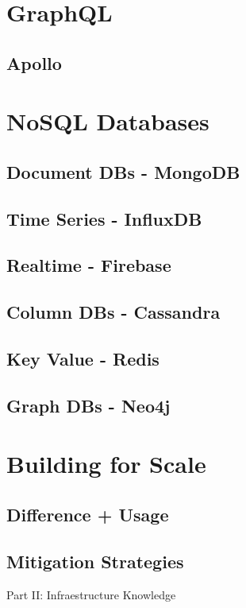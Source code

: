 \documentclass[a4paper]{article}
\begin{document}
    \newpage
    \section{GraphQL}
    \subsection{Apollo}

    \newpage
    \section{NoSQL Databases}
    \subsection{Document DBs - MongoDB}
    \subsection{Time Series - InfluxDB}
    \subsection{Realtime - Firebase}
    \subsection{Column DBs - Cassandra}
    \subsection{Key Value - Redis}
    \subsection{Graph DBs - Neo4j}

    \newpage
    \section{Building for Scale}
    \subsection{Difference + Usage}
    \subsection{Mitigation Strategies}


    \newpage

    \thispagestyle{empty} %
    \vspace*{\fill}
    \begin{center}
        \Huge Part II: Infraestructure Knowledge
    \end{center}
    \vspace*{\fill}
    \newpage
\end{document}
